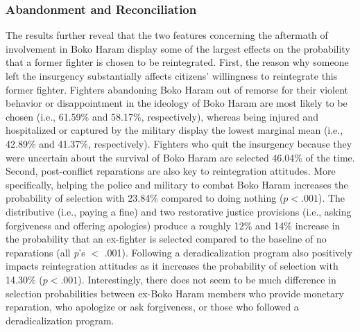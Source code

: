 \subsubsection{Abandonment and Reconciliation}
The results further reveal that the two features concerning the aftermath of involvement in Boko Haram display some of the largest effects on the probability that a former fighter is chosen to be reintegrated. First, the reason why someone left the insurgency substantially affects citizens' willingness to reintegrate this former fighter. Fighters abandoning Boko Haram out of remorse for their violent behavior or disappointment in the ideology of Boko Haram are most likely to be chosen (i.e., 61.59\% and 58.17\%, respectively), whereas being injured and hospitalized or captured by the military display the lowest marginal mean (i.e., 42.89\% and 41.37\%, respectively). Fighters who quit the insurgency because they were uncertain about the survival of Boko Haram are selected 46.04\% of the time. Second, post-conflict reparations are also key to reintegration attitudes. More specifically, helping the police and military to combat Boko Haram increases the probability of selection with 23.84\% compared to doing nothing ($p <.001$). The distributive (i.e., paying a fine) and two restorative justice provisions (i.e., asking forgiveness and offering apologies) produce a roughly 12\% and 14\% increase in the probability that an ex-fighter is selected compared to the baseline of no reparations (all \textit{p}'s $\mathrm{<}$ .001). Following a deradicalization program also positively impacts reintegration attitudes as it increases the probability of selection with 14.30\% ($p < .001$). Interestingly, there does not seem to be much difference in selection probabilities between ex-Boko Haram members who provide monetary reparation, who apologize or ask forgiveness, or those who followed a deradicalization program.


